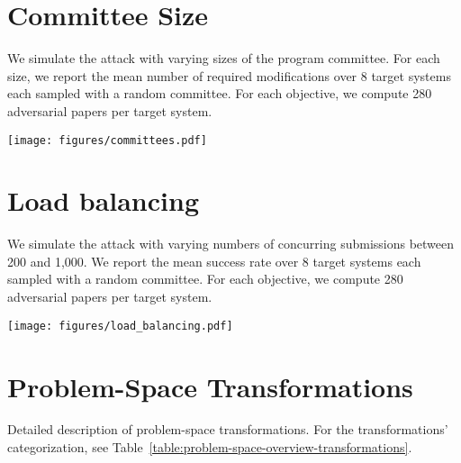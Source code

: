 \documentclass[letterpaper,twocolumn,10pt]{article}
\begin{document}
\begin{multicols}{2}

\section{Committee Size}
\label{app:committee-size}
\vspace{-0.5em}

We simulate the attack with varying sizes of the program committee. For each size, we report the mean number of required modifications over 8 target systems each sampled with a random committee. For each objective, we compute 280 adversarial papers per target system.
\vspace{-0.5em}

\begin{center}
\texttt{[image: figures/committees.pdf]}  
\end{center}

\section{Load balancing}
\label{app:load-balancing}
\vspace{-0.5em}

We simulate the attack with varying numbers of concurring submissions between 200 and 1,000. We report the mean success rate over 8 target systems each sampled with a random committee. For each objective, we compute 280 adversarial papers per target system.
\vspace{-0.5em}

\begin{center}
\texttt{[image: figures/load\_balancing.pdf]}  
\end{center}
\end{multicols}

\vspace{-1.25em}
\section{Problem-Space Transformations}
\label{app:problem-space-transformations}
\vspace{-0.5em}
Detailed description of problem-space transformations. For the transformations' categorization, see Table~\ref{table:problem-space-overview-transformations}.
\vspace{-0.25em}

\newcommand{\head}[1]{#1}
\end{document}
